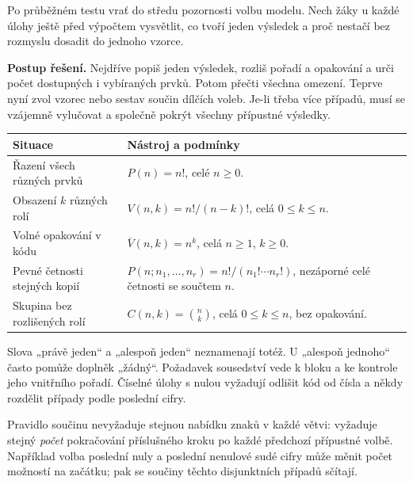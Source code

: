 \documentclass[11pt,a4paper]{article}
\begin{document}
Po průběžném testu vrať do středu pozornosti volbu modelu. Nech žáky u každé úlohy ještě před výpočtem vysvětlit, co tvoří jeden výsledek a proč nestačí bez rozmyslu dosadit do jednoho vzorce.


\textbf{Postup řešení.} Nejdříve popiš jeden výsledek, rozliš pořadí a opakování a urči počet dostupných i vybíraných prvků. Potom přečti všechna omezení. Teprve nyní zvol vzorec nebo sestav součin dílčích voleb. Je-li třeba více případů, musí se vzájemně vylučovat a společně pokrýt všechny přípustné výsledky.

\begin{tabularx}{\linewidth}{@{}>{\raggedright\arraybackslash}p{45mm}X@{}}
\toprule
\textbf{Situace} & \textbf{Nástroj a podmínky}\\\midrule
Řazení všech různých prvků & $P(n)=n!$, celé $n\geq0$.\\
Obsazení $k$ různých rolí & $V(n,k)=n!/(n-k)!$, celá $0\leq k\leq n$.\\
Volné opakování v kódu & $\overline V(n,k)=n^k$, celá $n\geq1$, $k\geq0$.\\
Pevné četnosti stejných kopií & $P(n;n_1,\ldots,n_r)=n!/(n_1!\cdots n_r!)$, nezáporné celé četnosti se součtem $n$.\\
Skupina bez rozlišených rolí & $C(n,k)=\binom nk$, celá $0\leq k\leq n$, bez opakování.\\
\bottomrule
\end{tabularx}

Slova „právě jeden“ a „alespoň jeden“ neznamenají totéž. U „alespoň jednoho“ často pomůže doplněk „žádný“. Požadavek sousedství vede k bloku a ke kontrole jeho vnitřního pořadí. Číselné úlohy s nulou vyžadují odlišit kód od čísla a někdy rozdělit případy podle poslední cifry.

Pravidlo součinu nevyžaduje stejnou nabídku znaků v každé větvi: vyžaduje stejný \emph{počet} pokračování příslušného kroku po každé předchozí přípustné volbě. Například volba poslední nuly a poslední nenulové sudé cifry může měnit počet možností na začátku; pak se součiny těchto disjunktních případů sčítají.
\end{document}
